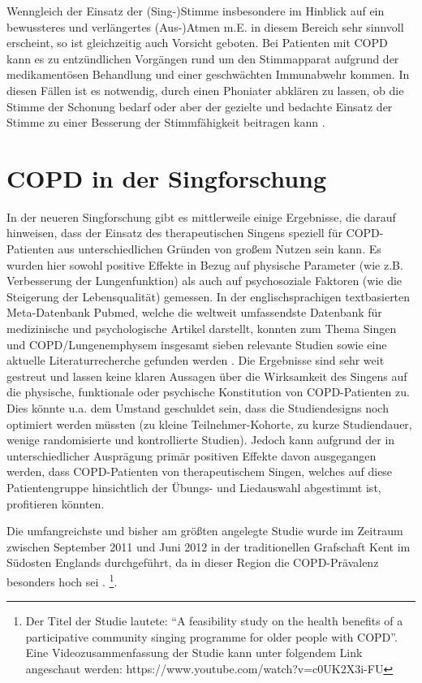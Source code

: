 Wenngleich der Einsatz der (Sing-)Stimme insbesondere im Hinblick auf ein bewussteres und verlängertes (Aus-)Atmen m.E. in diesem Bereich sehr sinnvoll erscheint, so ist gleichzeitig auch Vorsicht geboten. Bei Patienten mit COPD kann es zu entzündlichen Vorgängen rund um den Stimmapparat aufgrund der medikamentösen Behandlung und einer geschwächten Immunabwehr kommen. In diesen Fällen ist es notwendig, durch einen Phoniater abklären zu lassen, ob die Stimme der Schonung bedarf oder aber der gezielte und bedachte Einsatz der Stimme zu einer Besserung der Stimmfähigkeit beitragen kann \autocite[vgl.][103ff.]{alavi2009}.

\section{COPD in der Singforschung}
\label{copd_in_der_singforschung}
In der neueren Singforschung gibt es mittlerweile einige Ergebnisse, die darauf hinweisen, dass der Einsatz des therapeutischen Singens speziell für COPD-Patienten aus unterschiedlichen Gründen von großem Nutzen sein kann. Es wurden hier sowohl positive Effekte in Bezug auf physische Parameter (wie z.B. Verbesserung der Lungenfunktion) als auch auf psychosoziale Faktoren (wie die Steigerung der Lebensqualität) gemessen.
In der englischsprachigen textbasierten Meta-Datenbank Pubmed, welche die weltweit umfassendste Datenbank für medizinische und psychologische Artikel darstellt, konnten zum Thema Singen und COPD/Lungenemphysem insgesamt sieben relevante Studien sowie eine aktuelle Literaturrecherche gefunden werden \autocite{pmid19436683,pmid20175359,pmid20682030,pmid23145504,pmid23497924,pmid23497929,pmid24398814,pmid24793633}. Die Ergebnisse sind sehr weit gestreut und lassen keine klaren Aussagen über die Wirksamkeit des Singens auf die physische, funktionale oder psychische Konstitution von COPD-Patienten zu. Dies könnte u.a. dem Umstand geschuldet sein, dass die Studiendesigns noch optimiert werden müssten (zu kleine Teilnehmer-Kohorte, zu kurze Studiendauer, wenige randomisierte und kontrollierte Studien). Jedoch kann aufgrund der in unterschiedlicher Ausprägung primär positiven Effekte davon ausgegangen werden, dass COPD-Patienten von therapeutischem Singen, welches auf diese Patientengruppe hinsichtlich der Übungs- und Liedauswahl abgestimmt ist, profitieren könnten.

Die umfangreichste und bisher am größten angelegte Studie wurde im Zeitraum zwischen September 2011 und Juni 2012 in der traditionellen Grafschaft Kent im Südosten Englands durchgeführt, da in dieser Region die COPD-Prävalenz besonders hoch sei \autocite[vgl.][4]{clift2013}.  \footnote{Der Titel der Studie lautete: "`A feasibility study on the health benefits of a participative community singing programme for older people with COPD"'. Eine Videozusammenfassung der Studie kann unter folgendem Link angeschaut werden: https://www.youtube.com/watch?v=c0UK2X3i-FU}.

